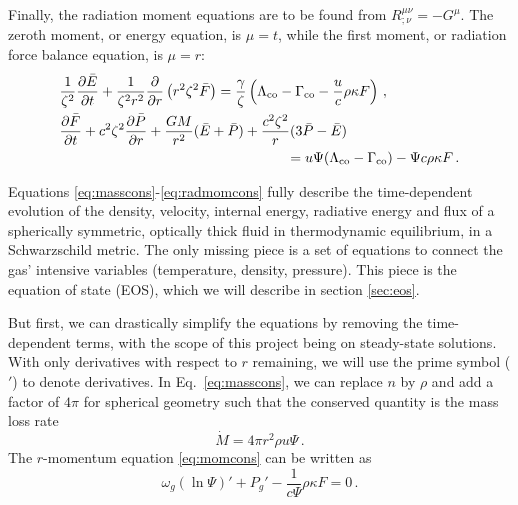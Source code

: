 \documentclass[../main.tex]{subfiles}
\begin{document}
Finally, the radiation moment equations are to be found from 
$R^{\mu\nu}_{;\nu}=-G^\mu$. The zeroth moment, or energy equation, is $\mu=t$, while the first moment, or radiation force balance equation, is $\mu=r$:
\begin{align}
    &\frac{1}{\zeta^2}\frac{\partial \bar{E}}{\partial t}+\frac{1}{\zeta^2r^2}\Partial{r}{r^2\zeta^2\bar{F}}=\frac{\gamma}{\zeta}\left(\Lambda_\text{co}-\Gamma_\text{co}-\frac{u}{c}\rho\kappa F\right)\label{eq:radenercons}\,,\\
    &\frac{\partial \bar{F}}{\partial t}+c^2\zeta^2\frac{\partial\bar{P}}{\partial r}+\frac{GM}{r^2}(\bar{E}+\bar{P})+\frac{c^2\zeta^2}{r}(3\bar{P}-\bar{E})\nonumber\\
    &\hspace*{5cm}\qquad=u\Psi(\Lambda_\text{co}-\Gamma_\text{co})-\Psi c\rho\kappa F\,.\label{eq:radmomcons}
\end{align}

Equations \eqref{eq:masscons}-\eqref{eq:radmomcons} fully describe the time-dependent evolution of the density, velocity, internal energy, radiative energy and flux of a spherically symmetric, optically thick fluid in thermodynamic equilibrium, in a Schwarzschild metric. The only missing piece is a set of equations to connect the gas' intensive variables (temperature, density, pressure). This piece is the equation of state (EOS), which we will describe in section \ref{sec:eos}.   

But first, we can drastically simplify the equations by removing the time-dependent terms, with the scope of this project being on steady-state solutions. With only derivatives with respect to $r$ remaining, we will use the prime symbol ($'$) to denote derivatives. In Eq.~\eqref{eq:masscons}, we can replace $n$ by $\rho$ and add a factor of $4\pi$ for spherical geometry such that the conserved quantity is the mass loss rate
\begin{equation}\label{eq:Mdot}
    \boxed{\dot{M}=4\pi r^2\rho u\Psi}\,.
\end{equation}
The $r$-momentum equation \eqref{eq:momcons} can be written as
\begin{equation}\label{eq:stationarymomcons}
     \boxed{\omega_g(\ln\Psi)' + P_g' - \frac{1}{c\Psi}\rho\kappa F = 0}\,.
\end{equation}
\end{document}
